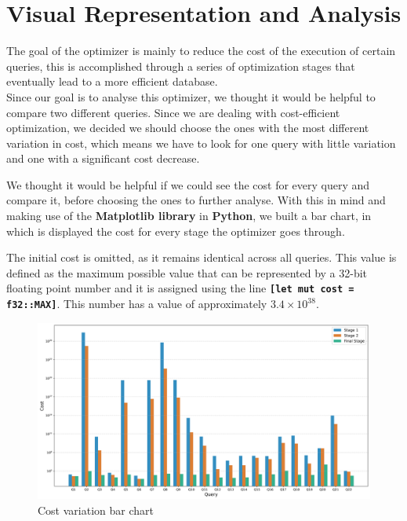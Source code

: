 \documentclass[a4paper,12pt]{scrreprt}
\begin{document}
\chapter{Visual Representation and Analysis} \label{chap:concDesenho}
\thispagestyle{fancy}
The goal of the optimizer is mainly to reduce the cost of the execution of certain queries, this is accomplished through a series of optimization stages that eventually lead to a more efficient database. \\
Since our goal is to analyse this optimizer, we thought it would be helpful to compare two different queries. Since we are dealing with cost-efficient optimization, we decided we should choose the ones with the most different variation in cost, which means we have to look for one query with little variation and one with a significant cost decrease.

We thought it would be helpful if we could see the cost for every query and compare it, before choosing the ones to further analyse. With this in mind and making use of the \textbf{Matplotlib library} in \textbf{Python}, we built a bar chart, in which is displayed the cost for every stage the optimizer goes through.

The initial cost is omitted, as it remains identical across all queries.
This value is defined as the maximum possible value that can be represented by a 32-bit floating point number and it is assigned using the line \textbf{\texttt{[let mut cost = f32::MAX]}}. This number has a value of approximately $3.4 \times 10^{38}$.

\begin{figure}[H]
    \includegraphics[width = 1.35\textwidth, height = 0.37\textheight, keepaspectratio]{img_cost_differential/cost_reduction_all_queries.png}
    \caption{Cost variation bar chart}
    \label{fig:cost1}
\end{figure}
\end{document}
